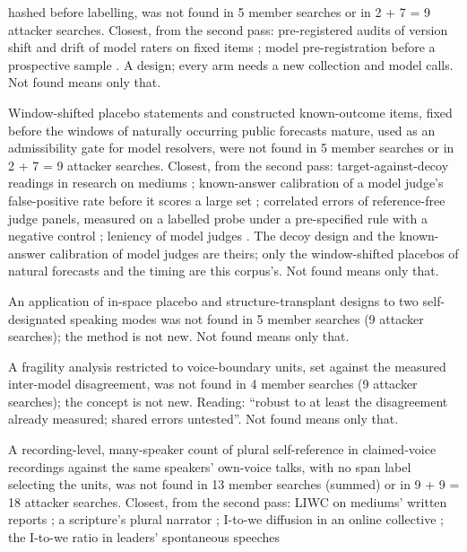 {\begin{description}
hashed before labelling, was not found in 5 member searches or in 2 + 7 = 9 attacker searches. Closest, from the
second pass: pre-registered audits of version shift and drift of model raters on fixed items
\cite{p12sunkavalli2026llm,p12wiese2026human}; model pre-registration before a prospective sample \cite{p12gu2026natural}.
A design; every arm needs a new collection and model calls. Not found means only that.
\item[N07.] Window-shifted placebo statements and constructed known-outcome items, fixed before the windows of naturally
occurring public forecasts mature, used as an admissibility gate for model resolvers, were not found in 5 member
searches or in 2 + 7 = 9 attacker searches. Closest, from the second pass: target-against-decoy readings in research
on mediums \cite{p12freire2022testing,p12tressoldi2025someone}; known-answer calibration of a model judge's
false-positive rate before it scores a large set \cite{p12feng2026noisy}; correlated errors of reference-free judge
panels, measured on a labelled probe under a pre-specified rule with a negative control \cite{p12zhou2026juryprobe};
leniency of model judges \cite{p12vaugrante2026much}. The decoy design and the known-answer calibration of model judges
are theirs; only the window-shifted placebos of natural forecasts and the timing are this corpus's. Not found means
only that.
\item[N08 (round~4 form).] An application of in-space placebo and structure-transplant designs to two self-designated
speaking modes was not found in 5 member searches (9 attacker searches); the method is not new. Not found means only
that.
\item[N09 (round~4 form).] A fragility analysis restricted to voice-boundary units, set against the measured
inter-model disagreement, was not found in 4 member searches (9 attacker searches); the concept is not new. Reading:
``robust to at least the disagreement already measured; shared errors untested''. Not found means only that.
\item[N10.] A recording-level, many-speaker count of plural self-reference in claimed-voice recordings against the same
speakers' own-voice talks, with no span label selecting the units, was not found in 13 member searches (summed) or in
9 + 9 = 18 attacker searches. Closest, from the second pass: LIWC on mediums' written reports
\cite{p12beischel2017quantitative}; a scripture's plural narrator \cite{p12mutter2022iltifat}; I-to-we diffusion in an
online collective \cite{p12sepahpourfard2024identity}; the I-to-we ratio in leaders' spontaneous speeches

\end{description}}
